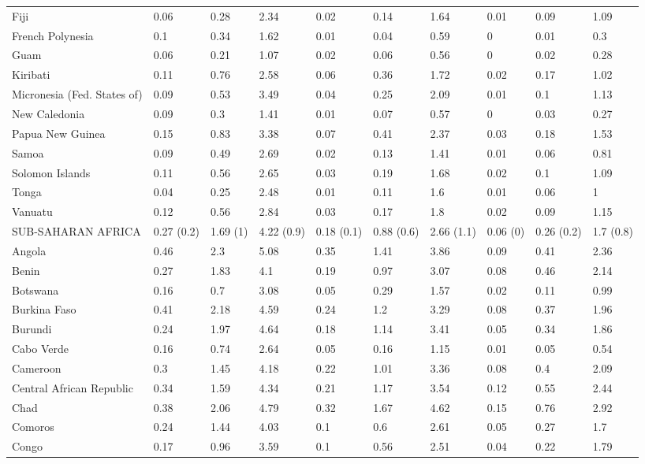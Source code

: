 \begin{longtable}[t]{llllllllll}
Fiji & 0.06 & 0.28 & 2.34 & 0.02 & 0.14 & 1.64 & 0.01 & 0.09 & 1.09\\
French Polynesia & 0.1 & 0.34 & 1.62 & 0.01 & 0.04 & 0.59 & 0 & 0.01 & 0.3\\
Guam & 0.06 & 0.21 & 1.07 & 0.02 & 0.06 & 0.56 & 0 & 0.02 & 0.28\\
Kiribati & 0.11 & 0.76 & 2.58 & 0.06 & 0.36 & 1.72 & 0.02 & 0.17 & 1.02\\
Micronesia (Fed. States of) & 0.09 & 0.53 & 3.49 & 0.04 & 0.25 & 2.09 & 0.01 & 0.1 & 1.13\\
New Caledonia & 0.09 & 0.3 & 1.41 & 0.01 & 0.07 & 0.57 & 0 & 0.03 & 0.27\\
Papua New Guinea & 0.15 & 0.83 & 3.38 & 0.07 & 0.41 & 2.37 & 0.03 & 0.18 & 1.53\\
Samoa & 0.09 & 0.49 & 2.69 & 0.02 & 0.13 & 1.41 & 0.01 & 0.06 & 0.81\\
Solomon Islands & 0.11 & 0.56 & 2.65 & 0.03 & 0.19 & 1.68 & 0.02 & 0.1 & 1.09\\
Tonga & 0.04 & 0.25 & 2.48 & 0.01 & 0.11 & 1.6 & 0.01 & 0.06 & 1\\
Vanuatu & 0.12 & 0.56 & 2.84 & 0.03 & 0.17 & 1.8 & 0.02 & 0.09 & 1.15\\
SUB-SAHARAN AFRICA & 0.27 (0.2) & 1.69 (1) & 4.22 (0.9) & 0.18 (0.1) & 0.88 (0.6) & 2.66 (1.1) & 0.06 (0) & 0.26 (0.2) & 1.7 (0.8)\\
Angola & 0.46 & 2.3 & 5.08 & 0.35 & 1.41 & 3.86 & 0.09 & 0.41 & 2.36\\
Benin & 0.27 & 1.83 & 4.1 & 0.19 & 0.97 & 3.07 & 0.08 & 0.46 & 2.14\\
Botswana & 0.16 & 0.7 & 3.08 & 0.05 & 0.29 & 1.57 & 0.02 & 0.11 & 0.99\\
Burkina Faso & 0.41 & 2.18 & 4.59 & 0.24 & 1.2 & 3.29 & 0.08 & 0.37 & 1.96\\
Burundi & 0.24 & 1.97 & 4.64 & 0.18 & 1.14 & 3.41 & 0.05 & 0.34 & 1.86\\
Cabo Verde & 0.16 & 0.74 & 2.64 & 0.05 & 0.16 & 1.15 & 0.01 & 0.05 & 0.54\\
Cameroon & 0.3 & 1.45 & 4.18 & 0.22 & 1.01 & 3.36 & 0.08 & 0.4 & 2.09\\
Central African Republic & 0.34 & 1.59 & 4.34 & 0.21 & 1.17 & 3.54 & 0.12 & 0.55 & 2.44\\
Chad & 0.38 & 2.06 & 4.79 & 0.32 & 1.67 & 4.62 & 0.15 & 0.76 & 2.92\\
Comoros & 0.24 & 1.44 & 4.03 & 0.1 & 0.6 & 2.61 & 0.05 & 0.27 & 1.7\\
Congo & 0.17 & 0.96 & 3.59 & 0.1 & 0.56 & 2.51 & 0.04 & 0.22 & 1.79\\

\end{longtable}
